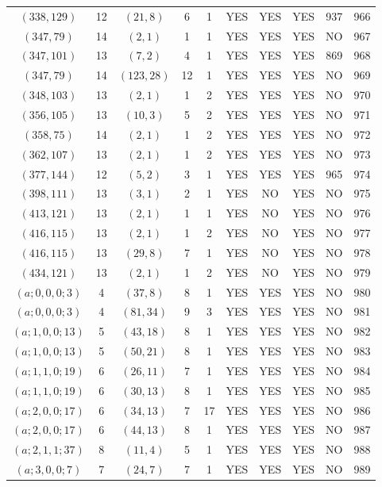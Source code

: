 \begin{longtable}{|c|c|c|c|c|c|c|c|c|c|}
$(338, 129)$ & 12 & $(21, 8)$ & 6 & 1 & YES & YES & YES & 937 & 966\\
$(347, 79)$ & 14 & $(2, 1)$ & 1 & 1 & YES & YES & YES & NO & 967\\
$(347, 101)$ & 13 & $(7, 2)$ & 4 & 1 & YES & YES & YES & 869 & 968\\
$(347, 79)$ & 14 & $(123, 28)$ & 12 & 1 & YES & YES & YES & NO & 969\\
$(348, 103)$ & 13 & $(2, 1)$ & 1 & 2 & YES & YES & YES & NO & 970\\
$(356, 105)$ & 13 & $(10, 3)$ & 5 & 2 & YES & YES & YES & NO & 971\\
$(358, 75)$ & 14 & $(2, 1)$ & 1 & 2 & YES & YES & YES & NO & 972\\
$(362, 107)$ & 13 & $(2, 1)$ & 1 & 2 & YES & YES & YES & NO & 973\\
$(377, 144)$ & 12 & $(5, 2)$ & 3 & 1 & YES & YES & YES & 965 & 974\\
$(398, 111)$ & 13 & $(3, 1)$ & 2 & 1 & YES & NO & YES & NO & 975\\
$(413, 121)$ & 13 & $(2, 1)$ & 1 & 1 & YES & NO & YES & NO & 976\\
$(416, 115)$ & 13 & $(2, 1)$ & 1 & 2 & YES & NO & YES & NO & 977\\
$(416, 115)$ & 13 & $(29, 8)$ & 7 & 1 & YES & NO & YES & NO & 978\\
$(434, 121)$ & 13 & $(2, 1)$ & 1 & 2 & YES & NO & YES & NO & 979\\
$(a; 0, 0, 0; 3)$ & 4 & $(37, 8)$ & 8 & 1 & YES & YES & YES & NO & 980\\
$(a; 0, 0, 0; 3)$ & 4 & $(81, 34)$ & 9 & 3 & YES & YES & YES & NO & 981\\
$(a; 1, 0, 0; 13)$ & 5 & $(43, 18)$ & 8 & 1 & YES & YES & YES & NO & 982\\
$(a; 1, 0, 0; 13)$ & 5 & $(50, 21)$ & 8 & 1 & YES & YES & YES & NO & 983\\
$(a; 1, 1, 0; 19)$ & 6 & $(26, 11)$ & 7 & 1 & YES & YES & YES & NO & 984\\
$(a; 1, 1, 0; 19)$ & 6 & $(30, 13)$ & 8 & 1 & YES & YES & YES & NO & 985\\
$(a; 2, 0, 0; 17)$ & 6 & $(34, 13)$ & 7 & 17 & YES & YES & YES & NO & 986\\
$(a; 2, 0, 0; 17)$ & 6 & $(44, 13)$ & 8 & 1 & YES & YES & YES & NO & 987\\
$(a; 2, 1, 1; 37)$ & 8 & $(11, 4)$ & 5 & 1 & YES & YES & YES & NO & 988\\
$(a; 3, 0, 0; 7)$ & 7 & $(24, 7)$ & 7 & 1 & YES & YES & YES & NO & 989\\

\end{longtable}
